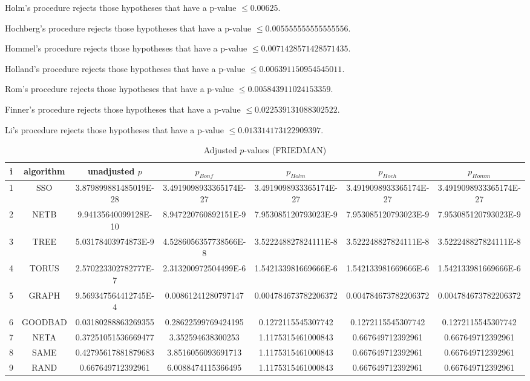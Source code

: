 \documentclass[a4paper,10pt]{article}
\begin{document}
\begin{landscape}
Holm's procedure rejects those hypotheses that have a p-value $\le0.00625$.


Hochberg's procedure rejects those hypotheses that have a p-value $\le0.005555555555555556$.


Hommel's procedure rejects those hypotheses that have a p-value $\le0.0071428571428571435$.


Holland's procedure rejects those hypotheses that have a p-value $\le0.006391150954545011$.


Rom's procedure rejects those hypotheses that have a p-value $\le0.005843911024153359$.


Finner's procedure rejects those hypotheses that have a p-value $\le0.022539131088302522$.


Li's procedure rejects those hypotheses that have a p-value $\le0.013314173122909397$.



\newpage

\begin{table}[!htp]
\centering\scriptsize
\caption{Adjusted $p$-values (FRIEDMAN)}
\begin{tabular}{ccccccc}
i&algorithm&unadjusted $p$&$p_{Bonf}$&$p_{Holm}$&$p_{Hoch}$&$p_{Homm}$\\
\hline
1& SSO&3.879899881485019E-28&3.4919098933365174E-27&3.4919098933365174E-27&3.4919098933365174E-27&3.4919098933365174E-27\\
2& NETB&9.94135640099128E-10&8.947220760892151E-9&7.953085120793023E-9&7.953085120793023E-9&7.953085120793023E-9\\
3& TREE&5.03178403974873E-9&4.5286056357738566E-8&3.522248827824111E-8&3.522248827824111E-8&3.522248827824111E-8\\
4& TORUS&2.570223302782777E-7&2.313200972504499E-6&1.542133981669666E-6&1.542133981669666E-6&1.542133981669666E-6\\
5& GRAPH&9.569347564412745E-4&0.00861241280797147&0.004784673782206372&0.004784673782206372&0.004784673782206372\\
6& GOODBAD&0.03180288863269355&0.28622599769424195&0.1272115545307742&0.1272115545307742&0.1272115545307742\\
7& NETA&0.37251051536669477&3.352594638300253&1.1175315461000843&0.667649712392961&0.667649712392961\\
8& SAME&0.42795617881879683&3.8516056093691713&1.1175315461000843&0.667649712392961&0.667649712392961\\
9& RAND&0.667649712392961&6.0088474115366495&1.1175315461000843&0.667649712392961&0.667649712392961\\
\hline
\end{tabular}
\end{table}


\end{landscape}
\end{document}
